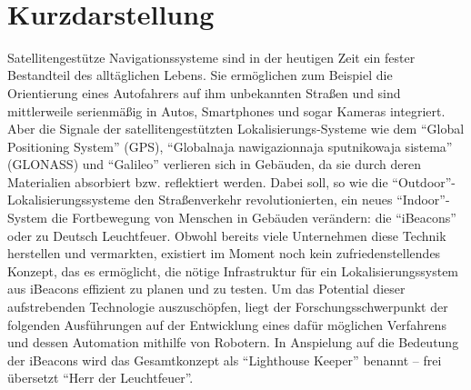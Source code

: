 \maketitle 
\newpage\thispagestyle{empty}~
\newpage
\setcounter{tocdepth}{2}

\chapter*{Kurzdarstellung}
Satellitengestütze Navigationssysteme sind in der heutigen Zeit ein fester Bestandteil des alltäglichen Lebens. Sie ermöglichen zum Beispiel die Orientierung eines Autofahrers auf ihm unbekannten Straßen und sind mittlerweile serienmäßig in Autos, Smartphones und sogar Kameras integriert. Aber die Signale der satellitengestützten Lokalisierungs-Systeme wie dem "`Global Positioning System"' (GPS), "`Globalnaja nawigazionnaja sputnikowaja sistema"' (GLONASS) und "`Galileo"' verlieren sich in Gebäuden, da sie durch deren Materialien absorbiert bzw. reflektiert werden. Dabei soll, so wie die "`Outdoor"'-Lokalisierungssysteme den Straßenverkehr revolutionierten, ein neues "`Indoor"'-System die Fortbewegung von Menschen in Gebäuden verändern: die "`iBeacons"' oder zu Deutsch Leuchtfeuer. Obwohl bereits viele Unternehmen diese Technik herstellen und vermarkten, existiert im Moment noch kein zufriedenstellendes Konzept, das es ermöglicht, die nötige Infrastruktur für ein Lokalisierungssystem aus iBeacons effizient zu planen und zu testen. Um das Potential dieser aufstrebenden Technologie auszuschöpfen, liegt der Forschungsschwerpunkt der folgenden Ausführungen auf der Entwicklung eines dafür möglichen Verfahrens und dessen Automation mithilfe von Robotern. In Anspielung auf die Bedeutung der iBeacons wird das Gesamtkonzept als "`Lighthouse Keeper"' benannt -- frei übersetzt "`Herr der Leuchtfeuer"'.